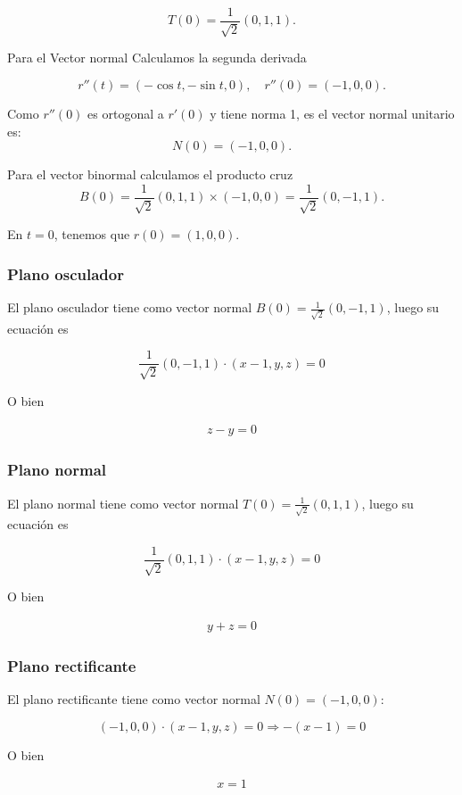 \documentclass{article}
\theoremstyle{definition}
\begin{document}
\[
T(0) = \frac{1}{\sqrt{2}}(0, 1, 1).
\]

Para el Vector normal  Calculamos la segunda derivada

\[
r''(t) = (-\cos t, -\sin t, 0), \quad r''(0) = (-1, 0, 0).
\]

Como $r''(0)$ es ortogonal a $r'(0)$ y tiene norma 1, es el vector normal unitario es:
\[
N(0) = (-1, 0, 0).
\]

Para el vector binormal calculamos el producto cruz
\[
B(0) = \frac{1}{\sqrt{2}}(0,1,1) \times (-1,0,0) = \frac{1}{\sqrt{2}}(0,-1,1).
\]


En $t=0 $, tenemos que $r(0) = (1, 0, 0)$.

\subsubsection*{Plano osculador}
El plano osculador tiene como vector normal $B(0) = \frac{1}{\sqrt{2}}(0, -1, 1)$, luego su ecuaci\'on es

\[
\frac{1}{\sqrt{2}}(0, -1, 1) \cdot (x - 1, y, z) = 0
\]

O bien


\begin{align*}
    z-y =0
\end{align*}

\subsubsection*{Plano normal}
El plano normal tiene como vector normal  $T(0) = \frac{1}{\sqrt{2}}(0, 1, 1)$, luego su ecuaci\'on es

\[
\frac{1}{\sqrt{2}}(0,1,1) \cdot (x - 1, y, z) = 0
\]

O bien

\begin{align*}
    y+z =0
\end{align*}

\subsubsection*{Plano rectificante}

El plano rectificante tiene como vector normal  $N(0) = (-1, 0, 0)$:

\[
(-1, 0, 0) \cdot (x - 1, y, z) = 0
\Rightarrow -(x - 1) = 0 
\]

O bien

\begin{align*}
    x =1
\end{align*}
\end{document}
